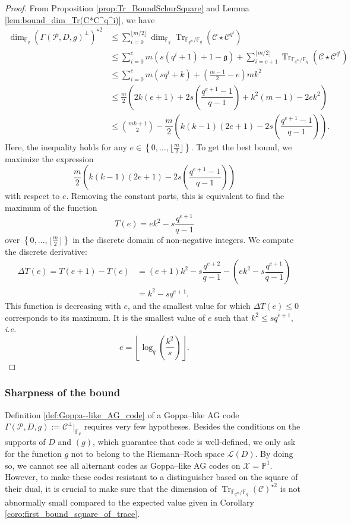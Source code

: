 \documentclass[a4paper]{article}
\theoremstyle{definition}
\theoremstyle{remark}
\newcommand{\calP}{\mathcal{P}}
\newcommand{\calL}{\mathcal{L}}
\newcommand{\calC}{\mathcal{C}}
\newcommand{\calX}{\mathcal{X}}
\newcommand{\fq}{\mathbb{F}_{q}}
\newcommand{\PP}{\mathbb{P}}
\newcommand{\Tr}[1]{\operatorname{Tr}_{\mathbb{F}_{q^m}/\fq}\left(#1\right)}
\newcommand{\set}[1]{\left\{#1\right\}}
\begin{document}
\begin{proof}
    From Proposition \ref{prop:Tr_BoundSchurSquare} and Lemma \ref{lem:bound_dim_Tr(C*C^q^i)}, we have 
    \begin{align*}
        \dim_{\fq}(\Gamma(\calP,D,g)^{\perp})^{\star 2}
        & \leq \sum\limits_{i=0}^{\lfloor m/2 \rfloor} \dim_{\fq} \Tr{\calC \star \calC^{q^i}} \\
        & \leq \sum\limits_{i=0}^{e} m(s(q^i+1)+1-\mathfrak{g})  + \sum\limits_{i=e+1}^{\lfloor m/2 \rfloor} \Tr{\calC \star \calC^{q^i}} \\
        & \leq \sum\limits_{i=0}^{e} m(sq^i+k) + \left( \frac{m-1}{2} -e \right)mk^2 \\
        & \leq \frac{m}{2}\left(2k(e+1)+2s\left(\dfrac{q^{e+1}-1}{q-1}\right)+k^2(m-1)-2ek^2  \right) \\
        & \leq \binom{mk+1}{2} -  \dfrac{m}{2}\left(k(k-1)(2e+1)-2s\left(\dfrac{q^{e+1}-1}{q-1}\right)\right).
    \end{align*}
Here, the inequality holds for any $e \in \set{0,\dots,\lfloor \frac{m}{2} \rfloor}$. To get the best bound, we maximize the expression $$ \dfrac{m}{2}\left(k(k-1)(2e+1)-2s\left(\dfrac{q^{e+1}-1}{q-1}\right)\right)$$ with respect to $e$. Removing the constant parts, this is equivalent to find the maximum of the function
$$T(e) = ek^2-s\dfrac{q^{e+1}}{q-1}$$
over $\set{0,\dots,\lfloor \frac{m}{2} \rfloor}$ in the discrete domain of non-negative integers.  
We compute the discrete derivative:
\begin{align*}
    \Delta T(e) = T(e+1)-T(e) &= (e+1)k^2-s\dfrac{q^{e+2}}{q-1} - \left(ek^2-s\dfrac{q^{e+1}}{q-1}\right) \\
                              &= k^2 - sq^{e+1}.
\end{align*}
This function is decreasing with $e$, and the smallest value for which $\Delta T(e) \leq 0$ corresponds to its maximum. It is the smallest value of $e$ such that $k^2 \leq sq^{e+1}$, \emph{i.e.}
$$e =  \left\lfloor \log_q\left(\dfrac{k^2}{s}\right)\right\rfloor.$$
\end{proof}

\subsubsection{Sharpness of the bound} \label{section:sharpness}

Definition \ref{def:Goppa--like_AG_code} of a Goppa--like AG code $\Gamma(\calP,D,g) := \calC^{\perp}|_{\fq}$ requires very few hypotheses. Besides the conditions on the supports of $D$ and $(g)$, which guarantee that code is well-defined, we only ask for the function $g$ not to belong to the Riemann--Roch space $\calL(D)$. By doing so, we cannot see all alternant codes as Goppa--like AG codes on $\calX=\PP^1$. However, to make these codes resistant to a distinguisher based on the square of their dual, it is crucial to make sure that the dimension of $\Tr{\calC}^{\star 2}$ is not abnormally small compared to the expected value given in Corollary \ref{coro:first_bound_square_of_trace}.
\end{document}
